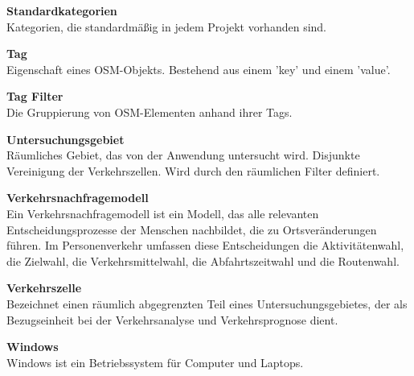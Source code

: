 \documentclass[parskip=full]{scrartcl} %
\begin{document}
\textbf{Standardkategorien}\\
Kategorien, die standardmäßig in jedem Projekt vorhanden sind.

\textbf{Tag}\\
Eigenschaft eines OSM-Objekts. Bestehend aus einem 'key' und einem 'value'.

\textbf{Tag Filter}\\
Die Gruppierung von OSM-Elementen anhand ihrer Tags.

\textbf{Untersuchungsgebiet}\\
Räumliches Gebiet, das von der Anwendung untersucht wird. Disjunkte Vereinigung der Verkehrszellen. Wird durch den räumlichen Filter definiert.

\textbf{Verkehrsnachfragemodell}\\
Ein Verkehrsnachfragemodell ist ein Modell, das alle relevanten Entscheidungsprozesse der Menschen nachbildet, die zu Ortsveränderungen führen. Im Personenverkehr umfassen diese Entscheidungen die Aktivitätenwahl, die Zielwahl, die Verkehrsmittelwahl, die Abfahrtszeitwahl und die Routenwahl.

\textbf{Verkehrszelle}\\
Bezeichnet einen räumlich abgegrenzten Teil eines Untersuchungsgebietes, der als Bezugseinheit bei der Verkehrsanalyse und Verkehrsprognose dient.

\textbf{Windows}\\
Windows ist ein Betriebssystem für Computer und Laptops.
\end{document}
